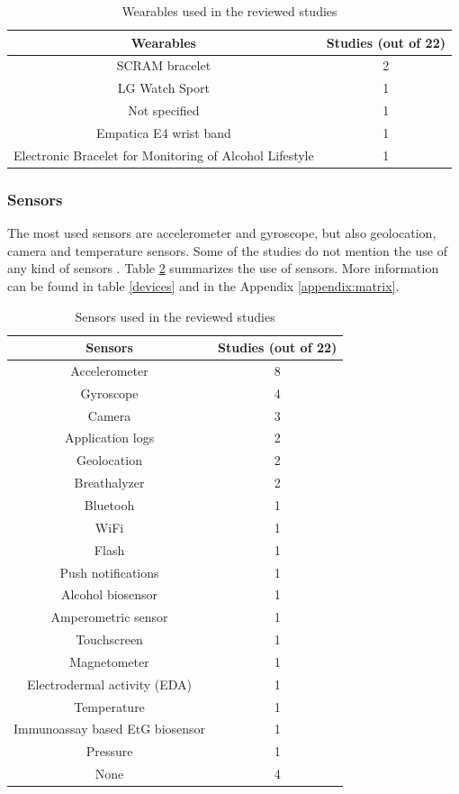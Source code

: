 \begin{table}[h!]
  \centering
 \begin{tabular}{||c | c ||}
 \hline
 \textbf{Wearables} & \textbf{Studies (out of 22)} \\ [0.5ex]
 \hline\hline
 SCRAM bracelet & 2\\
 \hline
 LG Watch Sport & 1\\
 \hline
 Not specified & 1\\
 \hline
 Empatica E4 wrist band &  1\\
 \hline
 Electronic Bracelet for Monitoring of Alcohol Lifestyle & 1\\[0.5ex]
 \hline
\end{tabular}
\caption{Wearables used in the reviewed studies}
\label{wearables}
\end{table}

\subsubsection{Sensors}

The most used sensors are accelerometer and gyroscope, but also geolocation, camera and temperature sensors. Some of the studies do not mention the use of any kind of sensors \cite{Garnett2019296,Leightley2018,Poulton201835,Bertholet2017285}. Table \ref{sensors} summarizes the use of sensors. More  information can be found in table \ref{devices} and in the Appendix \ref{appendix:matrix}.

\begin{table}[h!]
  \centering
 \begin{tabular}{||c | c ||}
 \hline
 \textbf{Sensors} & \textbf{Studies (out of 22)} \\ [0.5ex]
 \hline\hline
 Accelerometer & 8\\
 \hline
 Gyroscope & 4\\
 \hline
 Camera & 3\\
 \hline
 Application logs &  2\\
 \hline
 Geolocation &  2\\
 \hline
 Breathalyzer & 2\\
 \hline
 Bluetooh & 1\\
 \hline
 WiFi &  1\\
 \hline
 Flash & 1\\
 \hline
 Push notifications & 1\\
 \hline
 Alcohol biosensor & 1\\
 \hline
 Amperometric sensor & 1\\
 \hline
 Touchscreen &  1\\
 \hline
 Magnetometer & 1\\
 \hline
 Electrodermal activity (EDA) & 1\\
 \hline
 Temperature & 1\\
 \hline
 Immunoassay based EtG biosensor &  1\\
 \hline
 Pressure &  1\\
 \hline
 None & 4\\[0.5ex]
 \hline
\end{tabular}
\caption{Sensors \cite{Businelle2020} used in the reviewed studies}
\label{sensors}
\end{table}


